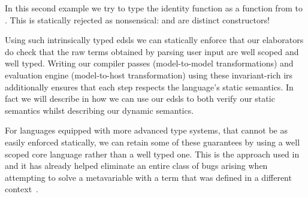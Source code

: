 In this second example we try to type the identity function as a function
from \TyNat to \TyBool. This is statically rejected as nonsensical:
 and  are distinct constructors!

\begin{center}
\end{center}


\noindent
Using such intrinsically typed \acp{edsl} we can statically enforce that
our elaborators do check that the raw terms obtained by parsing user input
are well scoped and well typed.
%
Writing our compiler passes (model-to-model transformations) and
evaluation engine (model-to-host transformation) using these
invariant-rich \acp{ir} additionally ensures that each step respects
the language's static semantics.
%
In fact we will describe in  how we can use our \acp{edsl}
to both verify our static semantics whilst describing our dynamic semantics.

For languages equipped with more advanced type systems, that cannot be as easily
enforced statically, we can retain some of these guarantees by using a well
scoped core language rather than a well typed one.
%
This is the approach used in \Idris{} and it has already helped eliminate an
entire class of bugs arising when attempting to solve a metavariable with a
term that was defined in a different context~\cite{DBLP:conf/ecoop/Brady21}.
